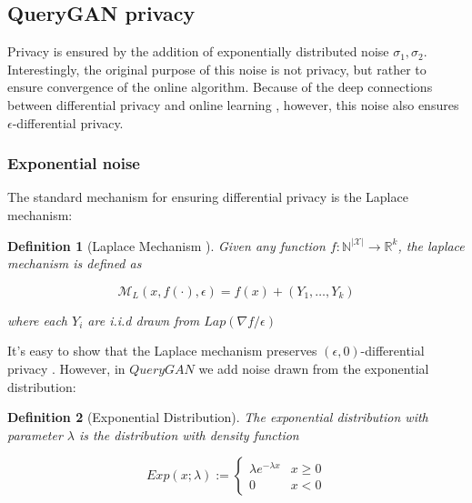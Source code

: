 \documentclass[]{article}
\newtheorem{definition}{Definition}[section]
\theoremstyle{definition}
\begin{document}

\subsection{QueryGAN privacy}
Privacy is ensured by the addition of exponentially distributed noise $\sigma_1, \sigma_2$. Interestingly, the original purpose of this noise is not privacy, but rather to ensure convergence of the online algorithm. Because of the deep connections between differential privacy and online learning \cite{NRVW19} \cite{GHM19}, however, this noise also ensures $\epsilon$-differential privacy. 

\subsubsection{Exponential noise}

The standard mechanism for ensuring differential privacy is the Laplace mechanism:

\begin{definition}[Laplace Mechanism \cite{DR13}]
    Given any function $f: \mathbb{N}^{|\mathcal{X}|} \to \mathbb{R}^k$, the laplace mechanism is defined as

    \begin{equation}
        \mathcal{M}_L(x, f(\cdot), \epsilon)=f(x)+\left(Y_1, \ldots, Y_k\right)
    \end{equation}

    where each $Y_i$ are i.i.d drawn from $Lap(\nabla f / \epsilon)$
\end{definition}

It's easy to show that the Laplace mechanism preserves $(\epsilon, 0)$-differential privacy \cite{DR13}. However, in $QueryGAN$ we add noise drawn from the exponential distribution:

\begin{definition}[Exponential Distribution]
    The exponential distribution with parameter $\lambda$ is the distribution with density function

    \begin{equation}
        Exp(x; \lambda) := \left\{\begin{array}{ll}{\lambda e^{-\lambda x}} & {x \geq 0} \\ {0} & {x<0}\end{array}\right.
    \end{equation}
\end{definition}
\end{document}

